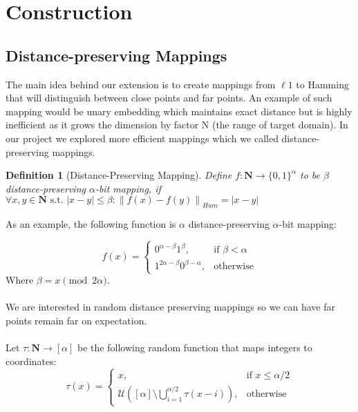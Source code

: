 \documentclass{scrartcl}
\newcommand{\zo}{\{0,1\}}
\newcommand{\st}{\text{ s.t. }}
\newcommand{\N}{{\mathbf{N}}}
\newtheorem{definition}[theorem]{Definition}
\newcommand{\norm}[1]{\left\lVert#1\right\rVert}
\begin{document}
\section{Construction}
\subsection{Distance-preserving Mappings}
The main idea behind our extension is to create mappings from $\ell1$ to Hamming that will distinguish between close points and far points. An example of such mapping would be unary embedding which maintains exact distance but is highly inefficient as it grows the dimension by factor N (the range of target domain). In our project we explored more efficient mappings which we called distance-preserving mappings.

\begin{definition}[Distance-Preserving Mapping]
	Define $f : \N \rightarrow \zo^\alpha$ to be $\beta$ distance-preserving $\alpha$-bit mapping, if $\forall x, y \in \N \st |x-y|\leq\beta : \norm{f(x)-f(y)}_{Ham} = |x-y|$
\end{definition}

As an example, the following function is $\alpha$ distance-preserving $\alpha$-bit mapping:

\[
f(x) =
\begin{cases}
    0^{\alpha-\beta}1^\beta,& \text{if } \beta < \alpha\\
    1^{2\alpha-\beta}0^{\beta-\alpha},              & \text{otherwise}
\end{cases}
\]
Where $\beta = x \pmod {2\alpha}$.
\paragraph{}

We are interested in random distance preserving mappings so we can have far points remain far on expectation.

\paragraph{}

Let $\tau : \N \rightarrow [\alpha]$ be the following random function that maps integers to coordinates:
\[
\tau(x) =
\begin{cases}
    x,& \text{if } x \leq \alpha/2\\
    \mathcal{U}([\alpha] \setminus \bigcup_{i=1}^{\alpha/2}\tau(x-i)),              & \text{otherwise}
\end{cases}
\]
\end{document}
